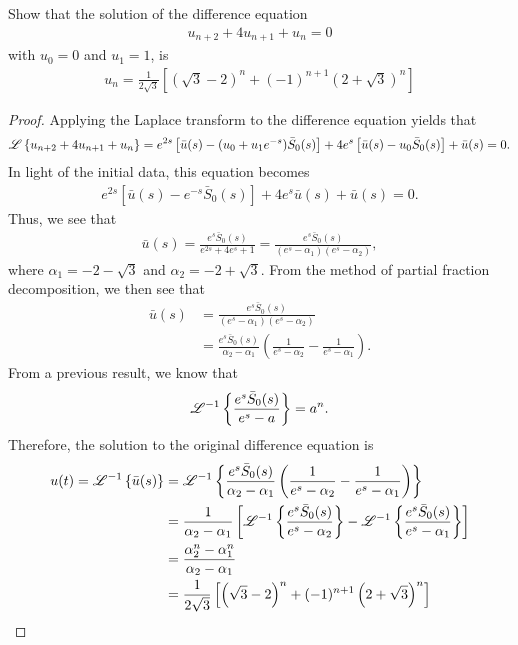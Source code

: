 \begin{problem}{4.36}
  Show that the solution of the difference equation
  \begin{align*}
    u_{n+2} + 4 u_{n+1} + u_n = 0
  \end{align*}
  with $u_0 = 0$ and $u_1 = 1$, is
  \begin{align*}
    u_n = \frac{1}{2\sqrt{3}}\left[\left(\sqrt{3}-2\right)^n + (-1)^{n+1} \left(2 + \sqrt{3}\right)^n\right]
  \end{align*}
\end{problem}

\begin{proof}
  Applying the Laplace transform to the difference equation yields that
  \begin{align*}
    \mathscr{L}\left\{ {u_{n+2} + 4 u_{n+1} + u_n} \right\} = e^{2s}\left[\bar{u}(s)-(u_0 + u_1e^{-s})\bar{S}_0(s)\right] + 4e^s\left[\bar{u}(s)-u_0 \bar{S}_0(s)\right] + \bar{u}(s) = 0.
  \end{align*}
  In light of the initial data, this equation becomes
  \begin{align*}
    e^{2s}\left[\bar{u}(s)-e^{-s}\bar{S}_0(s)\right] + 4e^s\bar{u}(s) + \bar{u}(s) = 0.
  \end{align*}
  Thus, we see that
  \begin{align*}
    \bar{u}(s) = \frac{e^{s}\bar{S}_0(s)}{e^{2s}+4e^{s}+1} = \frac{e^{s}\bar{S}_0(s)}{(e^s - \alpha_1)(e^s - \alpha_2)},
  \end{align*}
  where $\alpha_1 = -2 - \sqrt{3}$ and $\alpha_2 = -2 + \sqrt{3}$. From the method of partial fraction decomposition, we then see
  that
  \begin{align*}
    \bar{u}(s) &= \frac{e^{s}\bar{S}_0(s)}{(e^s - \alpha_1)(e^s - \alpha_2)} \\
    &= \frac{e^{s}\bar{S}_0(s)}{\alpha_2 - \alpha_1}\left(\frac{1}{e^s - \alpha_2} - \frac{1}{e^s-\alpha_1}\right).
  \end{align*}
  From a previous result, we know that
  \begin{align*}
    \mathscr{L}^{-1}\left\{ {\frac{e^{s}\bar{S}_0(s)}{e^s - a}} \right\} = a^n.
  \end{align*}
  Therefore, the solution to the original difference equation is
  \begin{align*}
    u(t) = \mathscr{L}^{-1}\left\{ {\bar{u}(s)} \right\} &= \mathscr{L}^{-1}\left\{ {\frac{e^{s}\bar{S}_0(s)}{\alpha_2 - \alpha_1}\left(\frac{1}{e^s - \alpha_2} - \frac{1}{e^s-\alpha_1}\right)} \right\} \\
    &= \frac{1}{\alpha_2 - \alpha_1}\left[\mathscr{L}^{-1}\left\{ {\frac{e^{s}\bar{S}_0(s)}{e^s - \alpha_2}} \right\} - \mathscr{L}^{-1}\left\{ {\frac{e^{s}\bar{S}_0(s)}{e^s - \alpha_1}} \right\}\right] \\
    &= \frac{\alpha_2^n - \alpha_1^n}{\alpha_2 - \alpha_1}\\
    &= \frac{1}{2\sqrt{3}}\left[\left(\sqrt{3}-2\right)^n + (-1)^{n+1} \left(2 + \sqrt{3}\right)^n\right]
  \end{align*}


\end{proof}
\newpage
